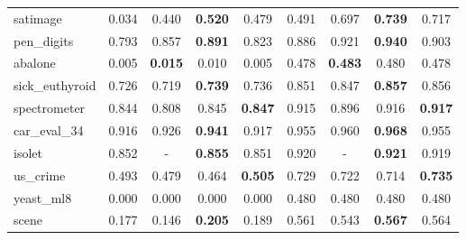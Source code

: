 \begin{figure}[ht]
\begin{tabular}{p{22mm}|*4{p{14mm}}|*4{p{14mm}}}
        satimage&\multicolumn{1}{c}{0.034}&\multicolumn{1}{c}{0.440}&\multicolumn{1}{c}{\textbf{0.520}}&\multicolumn{1}{c|}{0.479}&\multicolumn{1}{c}{0.491}&\multicolumn{1}{c}{0.697}&\multicolumn{1}{c}{\textbf{0.739}}&\multicolumn{1}{c}{0.717}\\
        pen\_digits&\multicolumn{1}{c}{0.793}&\multicolumn{1}{c}{0.857}&\multicolumn{1}{c}{\textbf{0.891}}&\multicolumn{1}{c|}{0.823}&\multicolumn{1}{c}{0.886}&\multicolumn{1}{c}{0.921}&\multicolumn{1}{c}{\textbf{0.940}}&\multicolumn{1}{c}{0.903}\\
        abalone&\multicolumn{1}{c}{0.005}&\multicolumn{1}{c}{\textbf{0.015}}&\multicolumn{1}{c}{0.010}&\multicolumn{1}{c|}{0.005}&\multicolumn{1}{c}{0.478}&\multicolumn{1}{c}{\textbf{0.483}}&\multicolumn{1}{c}{0.480}&\multicolumn{1}{c}{0.478}\\
        sick\_euthyroid&\multicolumn{1}{c}{0.726}&\multicolumn{1}{c}{0.719}&\multicolumn{1}{c}{\textbf{0.739}}&\multicolumn{1}{c|}{0.736}&\multicolumn{1}{c}{0.851}&\multicolumn{1}{c}{0.847}&\multicolumn{1}{c}{\textbf{0.857}}&\multicolumn{1}{c}{0.856}\\
        spectrometer&\multicolumn{1}{c}{0.844}&\multicolumn{1}{c}{0.808}&\multicolumn{1}{c}{0.845}&\multicolumn{1}{c|}{\textbf{0.847}}&\multicolumn{1}{c}{0.915}&\multicolumn{1}{c}{0.896}&\multicolumn{1}{c}{0.916}&\multicolumn{1}{c}{\textbf{0.917}}\\
        car\_eval\_34&\multicolumn{1}{c}{0.916}&\multicolumn{1}{c}{0.926}&\multicolumn{1}{c}{\textbf{0.941}}&\multicolumn{1}{c|}{0.917}&\multicolumn{1}{c}{0.955}&\multicolumn{1}{c}{0.960}&\multicolumn{1}{c}{\textbf{0.968}}&\multicolumn{1}{c}{0.955}\\
        isolet&\multicolumn{1}{c}{0.852}&\multicolumn{1}{c}{-}&\multicolumn{1}{c}{\textbf{0.855}}&\multicolumn{1}{c|}{0.851}&\multicolumn{1}{c}{0.920}&\multicolumn{1}{c}{-}&\multicolumn{1}{c}{\textbf{0.921}}&\multicolumn{1}{c}{0.919}\\
        us\_crime&\multicolumn{1}{c}{0.493}&\multicolumn{1}{c}{0.479}&\multicolumn{1}{c}{0.464}&\multicolumn{1}{c|}{\textbf{0.505}}&\multicolumn{1}{c}{0.729}&\multicolumn{1}{c}{0.722}&\multicolumn{1}{c}{0.714}&\multicolumn{1}{c}{\textbf{0.735}}\\
        yeast\_ml8&\multicolumn{1}{c}{0.000}&\multicolumn{1}{c}{0.000}&\multicolumn{1}{c}{0.000}&\multicolumn{1}{c|}{0.000}&\multicolumn{1}{c}{0.480}&\multicolumn{1}{c}{0.480}&\multicolumn{1}{c}{0.480}&\multicolumn{1}{c}{0.480}\\
        scene&\multicolumn{1}{c}{0.177}&\multicolumn{1}{c}{0.146}&\multicolumn{1}{c}{\textbf{0.205}}&\multicolumn{1}{c|}{0.189}&\multicolumn{1}{c}{0.561}&\multicolumn{1}{c}{0.543}&\multicolumn{1}{c}{\textbf{0.567}}&\multicolumn{1}{c}{0.564}\\

\end{tabular}
\end{figure}

